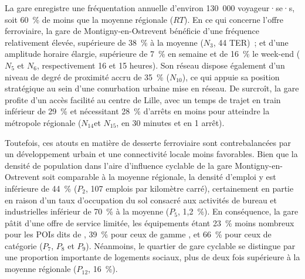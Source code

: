 \begin{refsegment}
La gare enregistre une fréquentation annuelle d'environ 130~000 voyageur·se·s, soit 60~\% de moins que la moyenne régionale (\(RT\)). En ce qui concerne l'offre ferroviaire, la gare de Montigny-en-Ostrevent bénéficie d'une fréquence relativement élevée, supérieure de 38~\% à la moyenne (\(N_{3}\), 44 \acrshort{TER})~; et d'une amplitude horaire élargie, supérieure de 7~\% en semaine et de 16~\% le week-end (\(N_{5}\) et \(N_{6}\), respectivement 16 et 15 heures). Son réseau dispose également d'un niveau de degré de proximité accru de 35~\% (\(N_{10}\)), ce qui appuie sa position stratégique au sein d'une conurbation urbaine mise en réseau. De surcroît, la gare profite d'un accès facilité au centre de Lille, avec un temps de trajet en train inférieur de 29~\% et nécessitant 28~\% d'arrêts en moins pour atteindre la métropole régionale (\(N_{14}\)et \(N_{15}\), en 30 minutes et en 1 arrêt).%

Toutefois, ces atouts en matière de desserte ferroviaire sont contrebalancées par un développement urbain et une connectivité locale moins favorables. Bien que la densité de population dans l'aire d'influence cyclable de la gare Montigny-en-Ostrevent soit comparable à la moyenne régionale, la densité d'emploi y est inférieure de 44~\% (\(P_{2}\), 107 emplois par kilomètre carré), certainement en partie en raison d'un taux d'occupation du sol consacré aux activités de bureau et industrielles inférieur de 70~\% à la moyenne (\(P_{5}\), 1,2~\%). En conséquence, la gare pâtit d'une offre de service limitée, les équipements étant 23~\% moins nombreux pour les \acrshort{POIs} dits de , 39~\% pour ceux de gamme , et 66~\% pour ceux de catégorie  (\(P_{7}\), \(P_{8}\) et \(P_{9}\)). Néanmoins, le quartier de gare cyclable se distingue par une proportion importante de logements sociaux, plus de deux fois supérieure à la moyenne régionale (\(P_{12}\), 16~\%).%


\end{refsegment}
